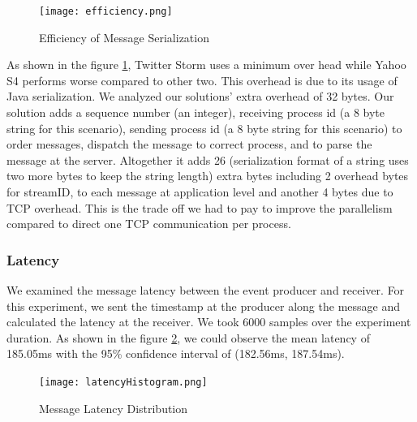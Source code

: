 \begin{figure}[!t]
        \centering
        \texttt{[image: efficiency.png]}
        \caption{Efficiency of Message Serialization}
        \label{efficiency}
\end{figure}

As shown in the figure \ref{efficiency}, Twitter Storm \cite{twitterStorm} uses a minimum over head while Yahoo S4 \cite{neumeyer2010s4} performs worse compared to other two. This overhead is due to its usage of Java serialization. We analyzed our solutions' extra overhead of 32 bytes. Our solution adds a sequence number (an integer), receiving process id (a 8 byte string for this scenario), sending process id (a 8 byte string for this scenario) to order messages, dispatch the message to correct process, and to parse the message at the server. Altogether it adds 26 (serialization format of a string uses two more bytes to keep the string length) extra bytes including 2 overhead bytes for streamID, to each message at application level and another 4 bytes due to TCP overhead. This is the trade off we had to pay to improve the parallelism compared to direct one TCP communication per process. 

\subsubsection{Latency}
We examined the message latency between the event producer and receiver. For this experiment, we sent the timestamp at the producer along the message and calculated the latency at the receiver. We took 6000 samples over the experiment duration. As shown in the figure \ref{latancydis}, we could observe the mean latency of 185.05ms with the 95\% confidence interval of (182.56ms, 187.54ms). 

\begin{figure}[!t]
        \centering
        \texttt{[image: latencyHistogram.png]}
        \caption{Message Latency Distribution}
        \label{latancydis}
\end{figure}


